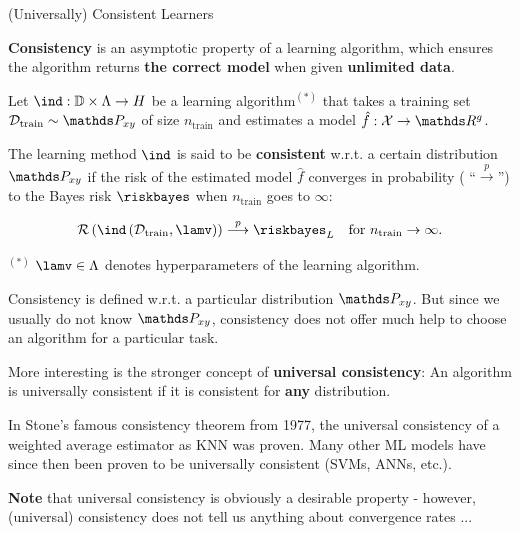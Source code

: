 \begin{vbframe}{(Universally) Consistent Learners}

\textbf{Consistency} is an asymptotic property of a learning algorithm, which ensures the algorithm returns \textbf{the correct model} when given \textbf{unlimited data}.

\lz 

Let $\ind:\mathbb{D}\times \Lambda \to \Hspace$ be a learning algorithm$^{(*)}$ that takes a training set $\Dtrain \sim \Pxy$ of size $n_\text{train}$ and estimates a model $\hat f: \Xspace \to \R^g$. 

\lz 

The learning method $\ind$ is said to be \textbf{consistent} w.r.t. a certain distribution $\Pxy$ if the risk of the estimated model $\hat f$ converges in probability ( \enquote{$\overset{p}{\longrightarrow}$}) to the Bayes risk $\riskbayes$ when $n_\text{train}$ goes to $\infty$: 

$$
	\risk\left(\ind\left(\Dtrain, \lamv\right)\right) \overset{p}{\longrightarrow} \riskbayes_L \quad \text{for } n_\text{train} \to \infty.
$$

\vfill


\begin{footnotesize}$^{(*)}$ $\lamv \in \Lambda$ denotes hyperparameters of the learning algorithm.\end{footnotesize} 

\framebreak 

Consistency is defined w.r.t. a particular distribution $\Pxy$.
But since we usually do not know $\Pxy$, consistency
does not offer much help to choose an algorithm for a particular task. 

\lz 

More interesting is the stronger concept of \textbf{universal consistency}: An algorithm is universally consistent if it is consistent for \textbf{any} distribution. 

\lz 

In Stone's famous consistency theorem from 1977, the universal consistency of a weighted average estimator as KNN was proven. Many other ML models have since then been proven to be universally consistent (SVMs, ANNs, etc.).

\lz

\textbf{Note} that universal consistency is obviously a desirable property - however, (universal) consistency does not tell us anything about convergence rates ...

\end{vbframe}


